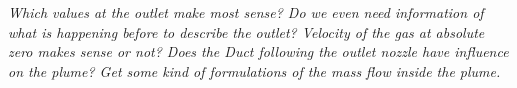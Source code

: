 {\color{greenColor}\itshape
Which values at the outlet make most sense?
Do we even need information of what is happening before to describe the outlet?
Velocity of the gas at absolute zero makes sense or not?
Does the Duct following the outlet nozzle have influence on the plume?
Get some kind of formulations of the mass flow inside the plume.
}
